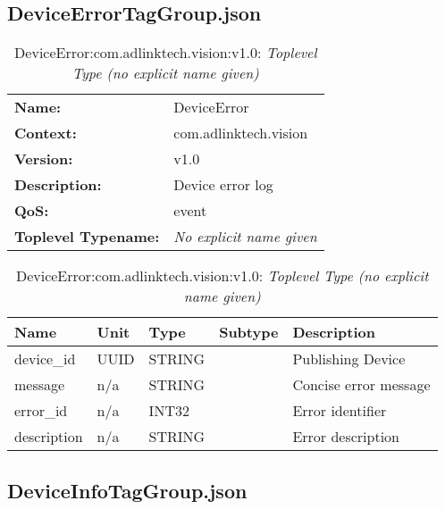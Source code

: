 \begin{table}[H]
\end{table}

\subsection{DeviceErrorTagGroup.json}

\begin{table}[H]
\begin{tabularx}{\textwidth}{l X} 
       \textbf{Name:} & DeviceError \\ 
	   \textbf{Context:} & com.adlinktech.vision \\ 
	   \textbf{Version:} & v1.0 \\ 
	   \textbf{Description:} & Device error log \\ 
	   \textbf{QoS:} & event \\
	   \textbf{Toplevel Typename:} & \textit{No explicit name given} \\ 
\end{tabularx}
\caption{DeviceError:com.adlinktech.vision:v1.0}\label{DeviceErrorTagGroup.json:table:DeviceError}
\bigskip
\begin{tabularx}{\textwidth}{l l l l X} 
	 \textbf{Name} & \textbf{Unit} & \textbf{Type} & \textbf{Subtype} & \textbf{Description} \\
	 \midrule
   device\_id & UUID & STRING &  & Publishing Device \\
   message & n/a & STRING &  & Concise error message \\
   error\_id & n/a & INT32 &  & Error identifier \\
   description & n/a & STRING &  & Error description \\
\end{tabularx}
\caption{DeviceError:com.adlinktech.vision:v1.0: \textit{Toplevel Type (no explicit name given)}}\label{DeviceErrorTagGroup.json:table:DeviceError-no-type-given}


\end{table}

\subsection{DeviceInfoTagGroup.json}

